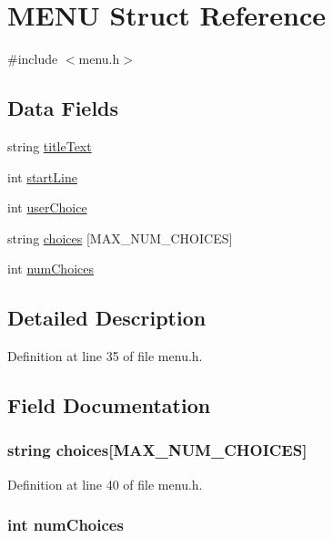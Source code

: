 \hypertarget{struct_m_e_n_u}{
\section{MENU Struct Reference}
\label{struct_m_e_n_u}
}


{\ttfamily \#include $<$menu.h$>$}

\subsection*{Data Fields}
\begin{DoxyCompactItemize}
\item 
string \hyperlink{struct_m_e_n_u_a7043504a82f5aa8ca6ae75675e2cd3ab}{titleText}
\item 
int \hyperlink{struct_m_e_n_u_aae69f615454d4cce6fddf760c20e9eb2}{startLine}
\item 
int \hyperlink{struct_m_e_n_u_ac273abc09d38d00e33071cfcf40b7335}{userChoice}
\item 
string \hyperlink{struct_m_e_n_u_a6f3eee97fe917c4e9a4faac1dbb9a0e7}{choices} \mbox{[}MAX\_\-NUM\_\-CHOICES\mbox{]}
\item 
int \hyperlink{struct_m_e_n_u_aa43da6ccae87d1a6236326c7b89b854e}{numChoices}
\end{DoxyCompactItemize}


\subsection{Detailed Description}


Definition at line 35 of file menu.h.



\subsection{Field Documentation}
\hypertarget{struct_m_e_n_u_a6f3eee97fe917c4e9a4faac1dbb9a0e7}{
\subsubsection[{choices}]{\setlength{\rightskip}{0pt plus 5cm}string {\bf choices}\mbox{[}MAX\_\-NUM\_\-CHOICES\mbox{]}}}
\label{struct_m_e_n_u_a6f3eee97fe917c4e9a4faac1dbb9a0e7}


Definition at line 40 of file menu.h.

\hypertarget{struct_m_e_n_u_aa43da6ccae87d1a6236326c7b89b854e}{
\subsubsection[{numChoices}]{\setlength{\rightskip}{0pt plus 5cm}int {\bf numChoices}}}
\label{struct_m_e_n_u_aa43da6ccae87d1a6236326c7b89b854e}


